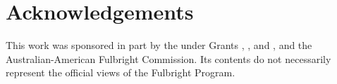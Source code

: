 \documentclass[sigconf]{style/acmart}
\begin{document}

\section*{Acknowledgements}
This work was sponsored in part by the  under Grants , , and , and the Australian-American Fulbright Commission. Its contents do not necessarily represent the official views of the Fulbright Program.




\end{document}
